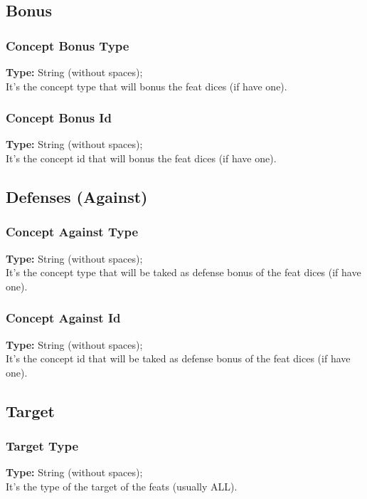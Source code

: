 \documentclass[letterpaper,12pt]{article}
\begin{document}
\subsection{Bonus}

\subsubsection{Concept Bonus Type}
{\bf Type:} String (without spaces);\\
It's the concept type that will bonus the feat dices (if have one).

\subsubsection{Concept Bonus Id}
{\bf Type:} String (without spaces);\\
It's the concept id that will bonus the feat dices (if have one).

\subsection{Defenses (Against)}

\subsubsection{Concept Against Type}
{\bf Type:} String (without spaces);\\
It's the concept type that will be taked as defense bonus of the feat dices (if
have one).

\subsubsection{Concept Against Id}
{\bf Type:} String (without spaces);\\
It's the concept id that will be taked as defense bonus of the feat dices (if
have one).

\subsection{Target}

\subsubsection{Target Type}
{\bf Type:} String (without spaces);\\
It's the type of the target of the feats (usually ALL).
\end{document}
